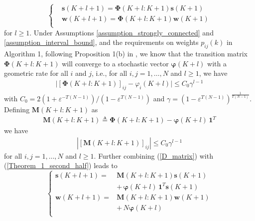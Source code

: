 \documentclass{IEEEtran}
\begin{document}
\begin{equation}\label{Theorem_1_second_half}
\left\lbrace \begin{aligned}
& \mathbf{s}(K+l+1) = \mathbf{\Phi}(K+l:K+1) \mathbf{s}(K+1)\\
& \mathbf{w}(K+l+1) = \mathbf{\Phi}(K+l:K+1) \mathbf{w}(K+1)\\
\end{aligned} \right.
\end{equation}
for $l \geq 1$. Under Assumptions \ref{assumption_strongly_connected} and \ref{assumption_interval_bound}, and the requirements on weights $p_{ij}(k)$ in Algorithm 1, following Proposition 1(b) in \cite{nedic2010constrained}, we know that the transition matrix $\mathbf{\Phi}(K+l:K+1)$ will converge to a stochastic vector $\boldsymbol{\varphi}(K+l)$ with a geometric rate for all $i$ and $j$, i.e., for all $i, j=1,\ldots,N$ and $l \geq 1$, we have
\begin{equation}\label{Phi_i_j}
\begin{aligned}
\big|[\mathbf{\Phi}(K+l:K+1)]_{ij}-\varphi_i(K+l)\big| \leq C_0 \gamma^{l-1}
\end{aligned}
\end{equation}
with $C_0=2 ({1+\varepsilon^{-T(N-1)}})/({1-\varepsilon^{T(N-1)}})$ and $\gamma= (1-\varepsilon^{T(N-1)}) ^{\frac{1}{T(N-1)}}$. Defining $\mathbf{M}(K+l:K+1)$ as
\begin{equation}\label{D_matrix}
\begin{aligned}
\mathbf{M}(K+l:K+1) \triangleq \mathbf{\Phi}(K+l:K+1)-\boldsymbol{\varphi}(K+l) \, \mathbf{1}^T
\end{aligned}
\end{equation}
we have
\begin{equation}\label{D_i_j}
\begin{aligned}
\left|\left[\mathbf{M}(K+l:K+1)\right]_{ij}\right| \leq C_0 \gamma^{l-1}
\end{aligned}
\end{equation}
for all $i, j=1,\ldots,N$ and $l \geq 1$. Further combining (\ref{D_matrix}) with (\ref{Theorem_1_second_half}) leads to
\begin{equation}\label{Theorem_1_second_half_new}
\left\lbrace \begin{aligned}
\mathbf{s}(K+l+1)= & \mathbf{M}(K+l:K+1) \mathbf{s}(K+1) \\
& + \, \boldsymbol{\varphi}(K+l) \, \mathbf{1}^T \mathbf{s}(K+1) \\
\mathbf{w}(K+l+1)= & \mathbf{M}(K+l:K+1) \mathbf{w}(K+1) \\
& + \, N \boldsymbol{\varphi}(K+l)\\
\end{aligned} \right.
\end{equation}
\end{document}
